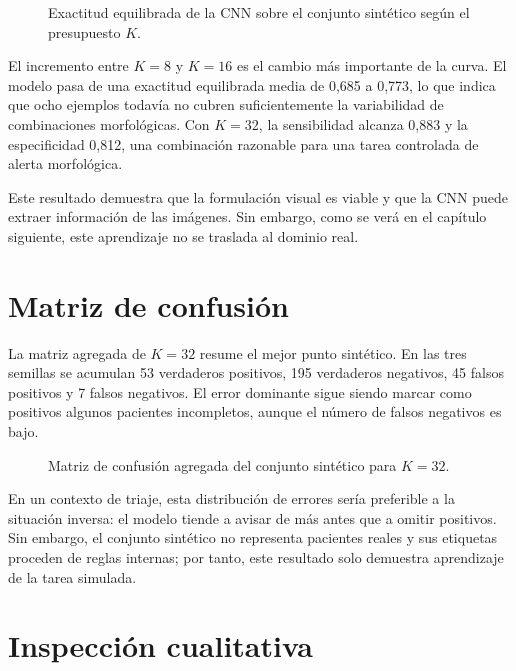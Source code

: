\begin{figure}[H]
  \centering
  \caption{Exactitud equilibrada de la CNN sobre el conjunto sintético según el presupuesto \(K\).}
  \label{fig:cnn_simulator_ba}
\end{figure}

El incremento entre \(K=8\) y \(K=16\) es el cambio más importante de la curva. El modelo pasa de una exactitud equilibrada media de 0,685 a 0,773, lo que indica que ocho ejemplos todavía no cubren suficientemente la variabilidad de combinaciones morfológicas. Con \(K=32\), la sensibilidad alcanza 0,883 y la especificidad 0,812, una combinación razonable para una tarea controlada de alerta morfológica.

Este resultado demuestra que la formulación visual es viable y que la CNN puede extraer información de las imágenes. Sin embargo, como se verá en el capítulo siguiente, este aprendizaje no se traslada al dominio real.

\section{Matriz de confusión}

La matriz agregada de \(K=32\) resume el mejor punto sintético. En las tres semillas se acumulan 53 verdaderos positivos, 195 verdaderos negativos, 45 falsos positivos y 7 falsos negativos. El error dominante sigue siendo marcar como positivos algunos pacientes incompletos, aunque el número de falsos negativos es bajo.

\begin{figure}[H]
  \centering
  \caption{Matriz de confusión agregada del conjunto sintético para \(K=32\).}
  \label{fig:cnn_simulator_confusion}
\end{figure}

En un contexto de triaje, esta distribución de errores sería preferible a la situación inversa: el modelo tiende a avisar de más antes que a omitir positivos. Sin embargo, el conjunto sintético no representa pacientes reales y sus etiquetas proceden de reglas internas; por tanto, este resultado solo demuestra aprendizaje de la tarea simulada.

\section{Inspección cualitativa}

